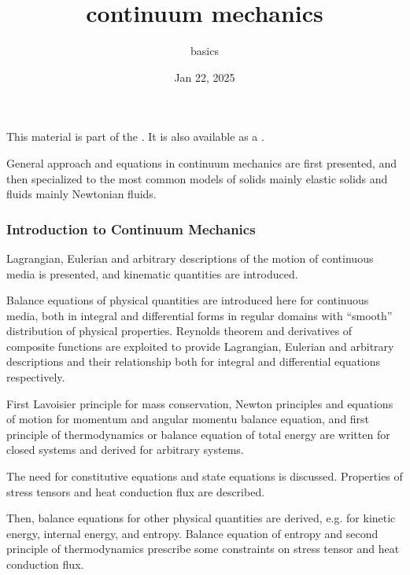 \documentclass[letterpaper,10pt,english]{jupyterBook}
\title{continuum mechanics}
\date{Jan 22, 2025}
\author{basics}
\begin{document}
\pagestyle{empty}
\sphinxmaketitle
\pagestyle{plain}
\sphinxtableofcontents
\pagestyle{normal}
\label{\detokenize{intro::doc}}


\sphinxAtStartPar
This material is part of the . It is also available as a .

\sphinxAtStartPar
General approach and equations in continuum mechanics are first presented, and then specialized to the most common models of solids \sphinxhyphen{} mainly elastic solids \sphinxhyphen{} and fluids \sphinxhyphen{} mainly Newtonian fluids.
\subsubsection*{Introduction to Continuum Mechanics}

\sphinxAtStartPar
{} Lagrangian, Eulerian and arbitrary descriptions of the motion of continuous media is presented, and kinematic quantities are introduced.

\sphinxAtStartPar
{} Balance equations of physical quantities are introduced here for continuous media, both in integral and differential forms \sphinxhyphen{} in regular domains with “smooth” distribution of physical properties. Reynolds theorem and derivatives of composite functions are exploited to provide Lagrangian, Eulerian and arbitrary descriptions \sphinxhyphen{} and their relationship \sphinxhyphen{} both for integral and differential equations respectively.

\sphinxAtStartPar
First Lavoisier principle for mass conservation, Newton principles and equations of motion for momentum and angular momentu balance equation, and first principle of thermodynamics or balance equation of total energy are written for closed systems \sphinxhyphen{} and derived for arbitrary systems.

\sphinxAtStartPar
The need for constitutive equations and state equations is discussed. Properties of stress tensors and heat conduction flux are described.

\sphinxAtStartPar
Then, balance equations for other physical quantities are derived, e.g. for kinetic energy, internal energy, and entropy. Balance equation of entropy and second principle of thermodynamics prescribe some constraints on stress tensor and heat conduction flux.
\end{document}
